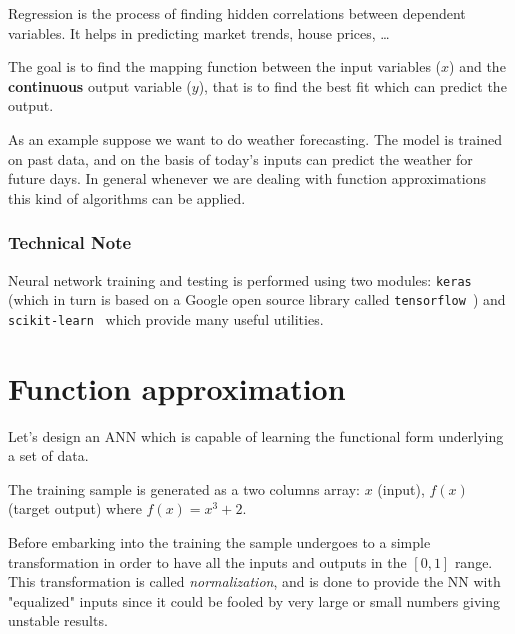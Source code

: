 Regression is the process of finding hidden correlations between dependent variables. It helps in predicting market trends, house prices, \ldots

The goal is to find the mapping function between the input variables (\(x\)) and the \textbf{continuous} output variable (\(y\)), that is to find the best fit which can predict the output.

As an example suppose we want to do weather forecasting. The model is trained on past data, and on the basis of today's inputs can predict the weather for future days. In general whenever we are dealing with function approximations this kind of algorithms can be applied.

\begin{attention}
\subsubsection{Technical Note}
\label{technical-note}

Neural network training and testing is performed using two modules: \texttt{keras}~\cite{bib:keras} (which in turn is based on a Google open source library called \texttt{tensorflow}~\cite{bib:tensorflow}) and \texttt{scikit-learn}~\cite{bib:scikit} which provide many useful utilities.

\end{attention}

\section{Function approximation}
\label{function-approximation}

Let's design an ANN which is capable of learning the functional form underlying a set of data. 

The training sample is generated as a two columns array: \(x\) (input), \(f(x)\) (target output) where \(f(x) = x^3 +2\). 

Before embarking into the training the sample undergoes to a simple transformation in order to have all the inputs and outputs in the \([0, 1]\) range. This transformation is called \emph{normalization}, and is done to provide the NN with "equalized" inputs since it could be fooled by very large or small numbers giving unstable results.

